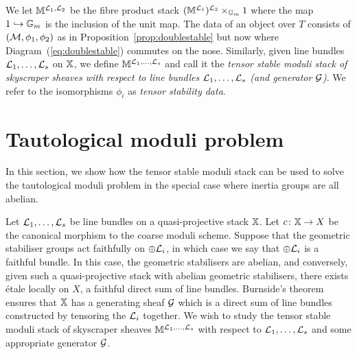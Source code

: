 \documentclass[12pt]{amsart}
\begin{document}
\begin{definition}  \label{defn:doubletensor}
We let $\mathbb{M}^{\mathcal{L}_1,\mathcal{L}_2}$ be the fibre product stack $(\mathbb{M}^{\mathcal{L}_1})^{\mathcal{L}_2} \times_{\mathbb{G}_m} 1$ where the map $1 \hookrightarrow \mathbb{G}_m$ is the inclusion of the unit map. The data of an object over $T$ consists of $(\mathcal{M}, \phi_1, \phi_2)$ as in Proposition~\ref{prop:doublestable} but now where Diagram~(\ref{eq:doublestable}) commutes on the nose. Similarly, given line bundles $\mathcal{L}_1,\ldots,\mathcal{L}_s$ on $\mathbb{X}$, we define $\mathbb{M}^{\mathcal{L}_1,\ldots,\mathcal{L}_s}$ and call it the {\em tensor stable moduli stack of skyscraper sheaves with respect to line bundles $\mathcal{L}_1, \ldots, \mathcal{L}_s$ (and generator $\mathcal{G}$)}. We refer to the isomorphisms $\phi_i$ as {\em tensor stability data}.
\end{definition}



\section{Tautological moduli problem}

In this section, we show how the tensor stable moduli stack can be used to solve the tautological moduli problem in the special case where inertia groups are all abelian.

Let $\mathcal{L}_1, \ldots, \mathcal{L}_s$ be line bundles on a quasi-projective stack $\mathbb{X}$. Let $c \colon \mathbb{X} \to X$ be the canonical morphism to the coarse moduli scheme. Suppose that the geometric stabiliser groups act faithfully on $\oplus \mathcal{L}_i$, in which case we say that $\oplus \mathcal{L}_i$ is a faithful bundle. In this case, the geometric stabilisers are abelian, and conversely, given such a quasi-projective stack with abelian geometric stabilisers, there exists \'etale locally on $X$, a faithful direct sum of line bundles. Burnside's theorem ensures that $\mathbb{X}$ has a generating sheaf $\mathcal{G}$ which is  a direct sum of line bundles constructed by tensoring the $\mathcal{L}_i$ together. We wish to study the tensor stable moduli stack of skyscraper sheaves $\mathbb{M}^{\mathcal{L}_1,\ldots,\mathcal{L}_s}$ with respect to $\mathcal{L}_1, \ldots, \mathcal{L}_s$ and some appropriate generator $\mathcal{G}$. 
\end{document}
